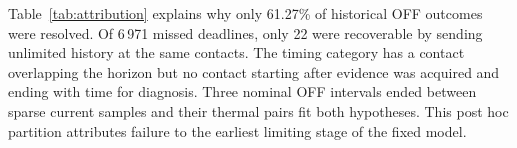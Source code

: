 Table~\ref{tab:attribution} explains why only 61.27\% of historical OFF outcomes were resolved. Of 6\,971 missed deadlines, only 22 were recoverable by sending unlimited history at the same contacts. The timing category has a contact overlapping the horizon but no contact starting after evidence was acquired and ending with time for diagnosis. Three nominal OFF intervals ended between sparse current samples and their thermal pairs fit both hypotheses. This post hoc partition attributes failure to the earliest limiting stage of the fixed model.
